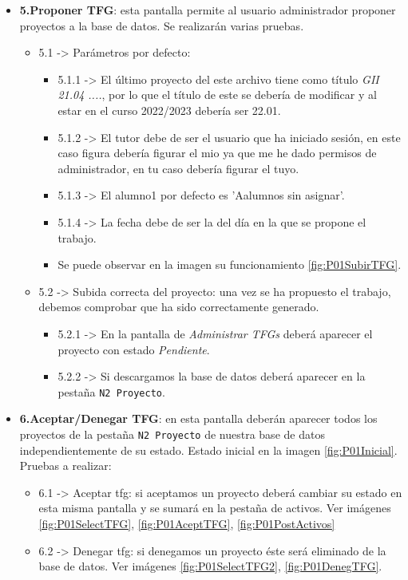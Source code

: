 \begin{itemize}
	
	\item \textbf{5.Proponer TFG}: esta pantalla permite al usuario administrador proponer proyectos a la base de datos. Se realizarán varias pruebas.
			\begin{itemize}
				\item 5.1 -> Parámetros por defecto: 
					\begin{itemize}
				 		\item 5.1.1 -> El último proyecto del este archivo tiene como título \emph{GII 21.04 ....}, por lo que el título de este se debería de modificar y al estar en el curso 2022/2023 debería ser 22.01.
				 		\item 5.1.2 -> El tutor debe de ser el usuario que ha iniciado sesión, en este caso figura debería figurar el mio ya que me he dado permisos de administrador, en tu caso debería figurar el tuyo.
				 		\item 5.1.3 -> El alumno1 por defecto es 'Aalumnos sin asignar'.
				 		\item 5.1.4 -> La fecha debe de ser la del día en la que se propone el trabajo.
				 		\item Se puede observar en la imagen su funcionamiento \ref{fig:P01SubirTFG}.
					\end{itemize}
				\item 5.2 -> Subida correcta del proyecto: una vez se ha propuesto el trabajo, debemos comprobar que ha sido correctamente generado.
					\begin{itemize}
						\item 5.2.1 -> En la pantalla de \emph{Administrar TFGs} deberá aparecer el proyecto con estado \emph{Pendiente}.
						\item 5.2.2 -> Si descargamos la base de datos deberá aparecer en la pestaña \texttt{N2 Proyecto}.						
					\end{itemize}				
			\end{itemize}

	
	\item \textbf{6.Aceptar/Denegar TFG}: en esta pantalla deberán aparecer todos los proyectos de la pestaña \texttt{N2 Proyecto} de nuestra base de datos independientemente de su estado. Estado inicial en la imagen \ref{fig:P01Inicial}. Pruebas a realizar:
		\begin{itemize}
			\item 6.1 -> Aceptar tfg: si aceptamos un proyecto deberá cambiar su estado en esta misma pantalla y se sumará en la pestaña de activos. Ver imágenes \ref{fig:P01SelectTFG},  \ref{fig:P01AceptTFG}, \ref{fig:P01PostActivos}
			\item 6.2 -> Denegar tfg: si denegamos un proyecto éste será eliminado de la base de datos. Ver imágenes \ref{fig:P01SelectTFG2},
			\ref{fig:P01DenegTFG}.
		\end{itemize}


\end{itemize}
